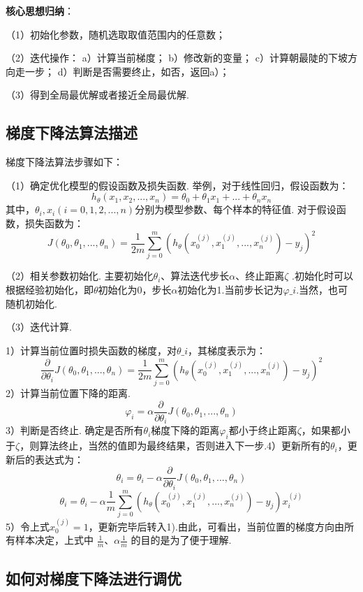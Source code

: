 \textbf{核心思想归纳}：

（1）初始化参数，随机选取取值范围内的任意数；

（2）迭代操作： a）计算当前梯度； b）修改新的变量；
c）计算朝最陡的下坡方向走一步； d）判断是否需要终止，如否，返回a）；

（3）得到全局最优解或者接近全局最优解.

\subsection{梯度下降法算法描述}\label{ux68afux5ea6ux4e0bux964dux6cd5ux7b97ux6cd5ux63cfux8ff0}

梯度下降法算法步骤如下：

（1）确定优化模型的假设函数及损失函数. ​
举例，对于线性回归，假设函数为： \[
  h_\theta(x_1,x_2,...,x_n)=\theta_0+\theta_1x_1+...+\theta_nx_n
\]
其中，$\theta_i,x_i(i=0,1,2,...,n)$分别为模型参数、每个样本的特征值.
对于假设函数，损失函数为： \[
  J(\theta_0,\theta_1,...,\theta_n)=\frac{1}{2m}\sum^{m}_{j=0}(h_\theta (x^{(j)}_0
    ,x^{(j)}_1,...,x^{(j)}_n)-y_j)^2
\]

（2）相关参数初始化. ​
主要初始化${\theta}_i$、算法迭代步长${\alpha}$、终止距离${\zeta}$ .初始化时可以根据经验初始化，即${\theta}
$初始化为0，步长${\alpha} $初始化为1.当前步长记为${\varphi}\_i
$.当然，也可随机初始化.

（3）迭代计算.

​ 1）计算当前位置时损失函数的梯度，对${\theta}\_i $，其梯度表示为：
\[
\frac{\partial}{\partial \theta_i}J({\theta}_0,{\theta}_1,...,{\theta}_n)=\frac{1}{2m}\sum^{m}_{j=0}(h_\theta (x^{(j)}_0
    ,x^{(j)}_1,...,x^{(j)}_n)-y_j)^2
\] ​ 2）计算当前位置下降的距离. \[
{\varphi}_i={\alpha} \frac{\partial}{\partial \theta_i}J({\theta}_0,{\theta}_1,...,{\theta}_n)
\] ​ 3）判断是否终止. ​
确定是否所有${\theta}_i$梯度下降的距离${\varphi}_i$都小于终止距离${\zeta}$，如果都小于${\zeta}$，则算法终止，当然的值即为最终结果，否则进入下一步.
​ 4）更新所有的${\theta}_i$，更新后的表达式为： \[
{\theta}_i={\theta}_i-\alpha \frac{\partial}{\partial \theta_i}J({\theta}_0,{\theta}_1,...,{\theta}_n)
\] \[
\theta_i=\theta_i - \alpha \frac{1}{m} \sum^{m}_{j=0}(h_\theta (x^{(j)}_0
    ,x^{(j)}_1,...,x^{(j)}_n)-y_j)x^{(j)}_i
\] ​ 5）令上式$x^{(j)}_0=1$，更新完毕后转入1). ​
由此，可看出，当前位置的梯度方向由所有样本决定，上式中
$\frac{1}{m}​$、$\alpha \frac{1}{m}​$ 的目的是为了便于理解.

\subsection{如何对梯度下降法进行调优}\label{ux5982ux4f55ux5bf9ux68afux5ea6ux4e0bux964dux6cd5ux8fdbux884cux8c03ux4f18}

